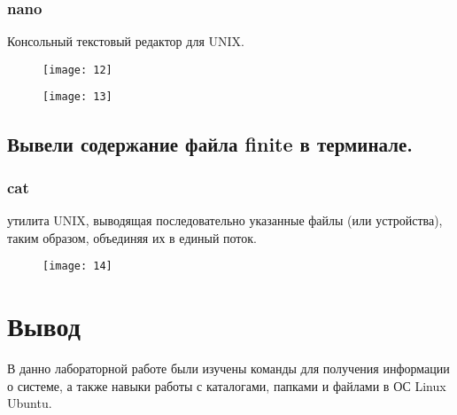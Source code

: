 \subsubsection{nano}
Консольный текстовый редактор для UNIX.
\begin{figure}[H]
	\begin{center}
		\texttt{[image: 12]}
		\caption{} 
		\label{pic:pic_15} %
	\end{center}
\end{figure} 

\begin{figure}[H]
	\begin{center}
		\texttt{[image: 13]}
		\caption{} 
		\label{pic:pic_16} %
	\end{center}
\end{figure}

\subsection{Вывели содержание файла finite в терминале.}

\subsubsection{cat}
утилита UNIX, выводящая последовательно указанные файлы (или устройства), таким образом, объединяя их в единый поток.

\begin{figure}[H]
	\begin{center}
		\texttt{[image: 14]}
		\caption{} 
		\label{pic:pic_18} %
	\end{center}
\end{figure}

\section{Вывод}
В данно лабораторной работе были изучены команды для получения информации о системе, а также навыки работы с каталогами, папками и файлами в ОС Linux Ubuntu. 


